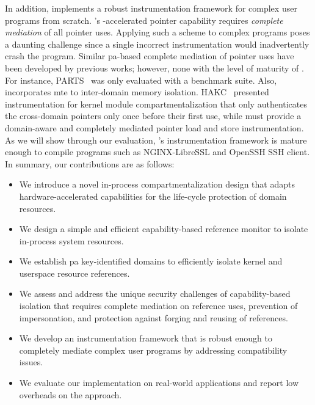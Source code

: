 In addition, \thename implements a robust instrumentation framework for complex user programs from scratch.
\thename's \pamte-accelerated pointer capability requires \emph{complete mediation} of all pointer uses.
Applying such a scheme  to complex programs poses a daunting challenge since a single incorrect instrumentation would inadvertently crash the program.
Similar \gls{pa}-based complete mediation of pointer uses have been developed by previous works; however, none with the level of maturity of \thename.
For instance, PARTS~\cite{pac-it-up} was only evaluated with a benchmark suite.
Also, \thename incorporates \gls{mte} to inter-domain memory isolation.
HAKC~\cite{hakc} presented \pamte instrumentation for kernel module compartmentalization that only authenticates the cross-domain pointers only once before their first use, while \thename must provide a domain-aware and completely mediated pointer load and store instrumentation.
As we will show through our evaluation, \thename's instrumentation framework is mature enough to compile programs such as NGINX-LibreSSL and OpenSSH SSH client.
In summary, our contributions are as follows:
\vspace{0.3em}
\begin{itemize}
	\setlength\itemsep{0.4em}
	\item[-] We introduce a novel in-process compartmentalization design that adapts hardware-accelerated capabilities for the life-cycle protection of domain resources.
	\item[-] We design a simple and efficient capability-based reference monitor to isolate in-process system resources.
	\item[-] We establish \gls{pa} key-identified domains to efficiently isolate kernel and userspace resource references.
	\item[-] We assess and address the unique security challenges of capability-based isolation that requires complete mediation on reference uses, prevention of impersonation, and protection against forging and reusing of references.
	\item[-] We develop an instrumentation framework that is robust enough to completely mediate complex user programs by addressing compatibility issues.
	\item[-] We evaluate our implementation on real-world applications and report low overheads on the approach.
\end{itemize}



